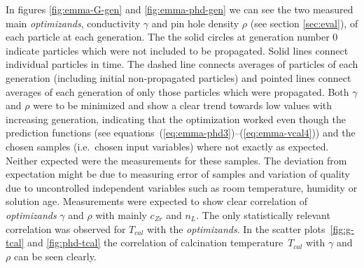 In figures \ref{fig:emma-G-gen} and \ref{fig:emma-phd-gen} we can see the two measured main \textit{optimizands}, 
conductivity $\gamma$ and pin hole density $\rho$ (see section \ref{sec:eval}), of each particle at each generation.
The the solid circles at generation number 0 indicate particles which were not included to be propagated. 
Solid lines connect individual particles in time. 
The dashed line connects averages of particles of each generation (including initial non-propagated particles) and 
pointed lines connect averages of each generation of only those particles which were propagated. 
%
Both $\gamma$ and $\rho$ were to be minimized and show a clear trend towards low values with increasing generation, 
indicating that the optimization worked even though 
the prediction functions (see equations~(\ref{eq:emma-phd3})--(\ref{eq:emma-vcal4})) 
and the chosen samples (i.e.\ chosen input variables) where not exactly as expected. 
Neither expected were the measurements for these samples.
The deviation from expectation might be due to measuring error of samples and variation of quality due to uncontrolled independent variables such as room temperature, humidity or solution age. 
Measurements were expected to show clear correlation of \textit{optimizands} $\gamma$ and $\rho$ with mainly $c_{Zr}$ and $n_L$.
The only statistically relevant correlation was observed for $T_{cal}$ with the \textit{optimizands}.
%
In the scatter plots~\ref{fig:g-tcal} and \ref{fig:phd-tcal} the correlation of calcination temperature~$T_{cal}$ with $\gamma$ and $\rho$ can be seen clearly. 

